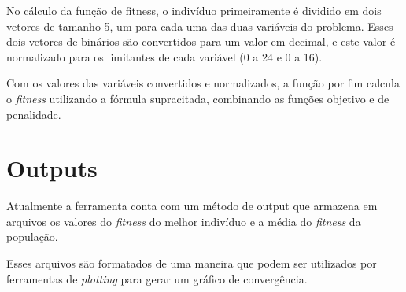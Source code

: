 \documentclass[12pt]{article}
\begin{document}
No cálculo da função de fitness, o indivíduo primeiramente é dividido em dois vetores de tamanho 5, 
um para cada uma das duas variáveis do problema. Esses dois vetores de binários são convertidos para 
um valor em decimal, e este valor é normalizado para os limitantes de cada variável (0 a 24 e 0 a 16).

Com os valores das variáveis convertidos e normalizados, a função por fim calcula o \textit{fitness}
utilizando a fórmula supracitada, combinando as funções objetivo e de penalidade.

\section{Outputs}

Atualmente a ferramenta conta com um método de output que armazena em arquivos os valores do \textit{fitness}
do melhor indivíduo e a média do \textit{fitness} da população. 

Esses arquivos são formatados de uma maneira que podem ser utilizados por ferramentas de \textit{plotting}
para gerar um gráfico de convergência.



\end{document}
